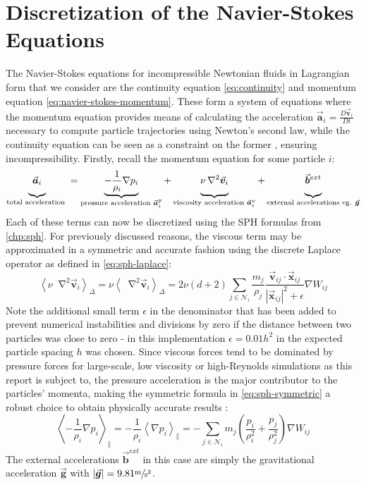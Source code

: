 \documentclass[oneside, a4paper]{book}
\newcommand\abs[1]{\left|#1\right|}
\newcommand\angled[1]{\left\langle#1\right\rangle}
\newcommand*\Laplace{\mathop{}\!\mathbin\nabla^2}
\newcommand\vek[1]{\vec{\bm{#1}}}
\newcommand\br[1]{\left(#1\right)}
\begin{document}
    \section{Discretization of the Navier-Stokes Equations}\label{sec:sph-navier-stokes}
    The Navier-Stokes equations for incompressible Newtonian fluids in Lagrangian form that we consider are the continuity equation \autoref{eq:continuity} and momentum equation \autoref{eq:navier-stokes-momentum}. These form a system of equations where the momentum equation provides means of calculating the acceleration $\vek{a}_i = \frac{D\vek{v}_i}{Dt}$ necessary to compute particle trajectories using Newton's second law, while the continuity equation can be seen as a constraint on the former \autocite{tutorial2019}, ensuring incompressibility. Firstly, recall the momentum equation for some particle $i$:
    \begin{equation}\label{eq:navier-stokes-annotated}
      \underbrace{\vek{a}_i  \vphantom{\frac{1}{\rho_i}\nabla}}
        _{\text{total acceleration }}=
      \underbrace{-\frac{1}{\rho_i}\nabla p_i}
        _{\text{pressure acceleration }\vek{a}_i^p} + 
      \underbrace{\nu\Laplace\vek{v}_i  \vphantom{\frac{1}{\rho_i}\nabla}}
        _{\text{viscosity acceleration }\vek{a}_i^\nu}+
      \underbrace{\vek{b}^{ext} \vphantom{\frac{1}{\rho_i}\nabla}}
        _{\text{external accelerations eg. }\vek{g}}
    \end{equation}
    Each of these terms can now be discretized using the SPH formulas from \autoref{chp:sph}. For previously discussed reasons, the viscous term may be approximated in a symmetric and accurate fashion using the discrete Laplace operator as defined in \autoref{eq:sph-laplace}:
    \begin{equation}\label{eq:discrete-viscous}
      \angled{\nu\Laplace\vek{v}_i}_\Delta = \nu\angled{\Laplace\vek{v}_i}_\Delta = 2\nu(d+2)\sum_{j\in\mathcal{N}_i}\frac{m_j}{\rho_j} \frac{\vek{v}_{ij}\cdot\vek{x}_{ij}}{\abs{\vek{x}_{ij}}^2+\epsilon}\nabla W_{ij}
    \end{equation}
    Note the additional small term $\epsilon$ in the denominator that has been added to prevent numerical instabilities and divisions by zero if the distance between two particles was close to zero - in this implementation $\epsilon=0.01h^2$ in the expected particle spacing $h$ was chosen.
    Since viscous forces tend to be dominated by pressure forces for large-scale, low viscosity or high-Reynolds simulations as this report is subject to, the pressure acceleration is the major contributor to the particles' momenta, making the symmetric formula in \autoref{eq:sph-symmetric} a robust choice to obtain physically accurate results \autocite{tutorial2019}:
    \begin{equation}\label{eq:discrete-pressure}
      \angled{-\frac{1}{\rho_i}\nabla p_i}_\parallel 
      = -\frac{1}{\rho_i}\angled{\nabla p_i}_\parallel 
      = -\sum_{j\in\mathcal{N}_i} m_j \br{\frac{p_i}{\rho_i^2} + \frac{p_j}{\rho_j^2}} \nabla W_{ij}
    \end{equation}
    The external accelerations $\vek{b}^{ext}$ in this case are simply the gravitational acceleration $\vek{g}$ with $\abs{\vek{g}}=9.81\sfrac{\si{\meter}}{\si{\second}^2}$. 
\end{document}
